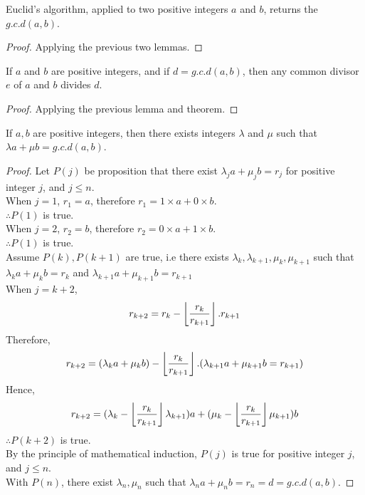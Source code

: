 \documentclass[a4paper]{article}
\begin{document}
\begin{thm}
Euclid’s algorithm, applied to two positive integers $a$ and $b$, returns the $g.c.d(a, b)$.
\end{thm}
\begin{proof}
Applying the previous two lemmas.
\end{proof}

\begin{thm}
If $a$ and $b$ are positive integers, and if $d = g.c.d(a,b)$, then any common divisor $e$ of $a$ and $b$ divides $d$.
\end{thm}
\begin{proof}
Applying the previous lemma and theorem.
\end{proof}

\begin{thm}
If $a, b$ are positive integers, then there exists integers $\lambda$ and $\mu$ such that $\lambda a + \mu b = g.c.d(a, b)$.
\end{thm}
\begin{proof}
Let $P(j)$ be proposition that there exist $\lambda_{j}a + \mu_{j}b = r_j$ for positive integer $j$, and $j \leq n$.\\
When $j=1$, $r_1 = a$, therefore $r_1 = 1 \times a + 0 \times b$.\\
$\therefore P(1)$ is true.\\
When $j=2$, $r_2 = b$, therefore $r_2 = 0 \times a + 1 \times b$.\\
$\therefore P(1)$ is true.\\
Assume $P(k), P(k+1)$ are true, i.e there exists $\lambda_{k}, \lambda_{k+1}, \mu_{k}, \mu_{k+1}$ such that $\lambda_{k}a + \mu_{k}b = r_k$ and $\lambda_{k+1}a + \mu_{k+1}b = r_{k+1}$\\
When $j=k+2$, $$r_{k+2} = r_k - \left\lfloor \frac{r_k}{r_{k+1}} \right\rfloor . r_{k+1}$$
Therefore, $$r_{k+2} = (\lambda_{k}a + \mu_{k}b) - \left\lfloor \frac{r_k}{r_{k+1}} \right\rfloor . (\lambda_{k+1}a + \mu_{k+1}b = r_{k+1})$$
Hence, $$r_{k+2} = (\lambda_{k} - \left\lfloor \frac{r_k}{r_{k+1}} \right\rfloor\lambda_{k+1})a + (\mu_{k} - \left\lfloor \frac{r_k}{r_{k+1}} \right\rfloor\mu_{k+1})b$$
$\therefore P(k+2)$ is true.\\
By the principle of mathematical induction, $P(j)$ is true for positive integer $j$, and $j \leq n$.\\
With $P(n)$, there exist $\lambda_{n}, \mu_{n}$ such that $\lambda_{n}a + \mu_{n}b = r_n = d = g.c.d(a,b)$.
\end{proof}
\end{document}
